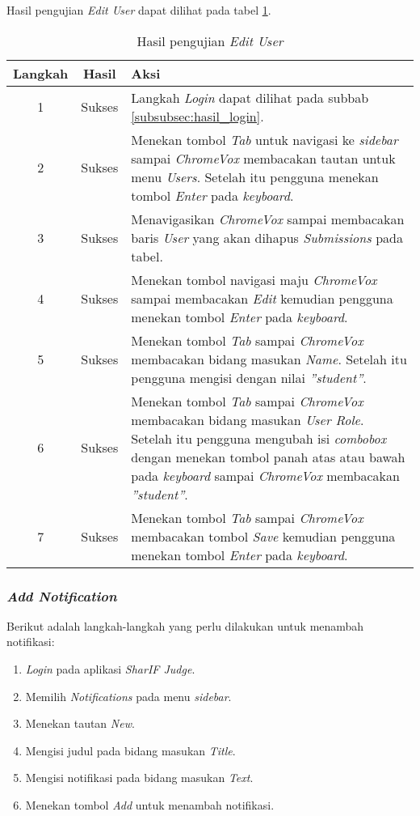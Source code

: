 Hasil pengujian \textit{Edit User} dapat dilihat pada tabel \ref{tab:hasil_edit_user}.

\begin{table}[H]
	\centering
	\caption{Hasil pengujian \textit{Edit User}}
	\label{tab:hasil_edit_user}
	\begin{tabular}{|c|c|p{12cm}|}
		\toprule
		Langkah & Hasil & Aksi\\
		\midrule
		1 & Sukses & Langkah \textit{Login} dapat dilihat pada subbab \ref{subsubsec:hasil_login}.\\
		2 & Sukses & Menekan tombol \textit{Tab} untuk navigasi ke \textit{sidebar} sampai \textit{ChromeVox} membacakan tautan untuk menu \textit{Users}. Setelah itu pengguna menekan tombol \textit{Enter} pada \textit{keyboard}.\\
		3 & Sukses & Menavigasikan \textit{ChromeVox} sampai membacakan baris \textit{User} yang akan dihapus \textit{Submissions} pada tabel.\\
		4 & Sukses & Menekan tombol navigasi maju \textit{ChromeVox} sampai membacakan \textit{Edit} kemudian pengguna menekan tombol \textit{Enter} pada \textit{keyboard}.\\
		5 & Sukses & Menekan tombol \textit{Tab} sampai \textit{ChromeVox} membacakan bidang masukan \textit{Name}. Setelah itu pengguna mengisi dengan nilai \textit{''student''}.\\
		6 & Sukses & Menekan tombol \textit{Tab} sampai \textit{ChromeVox} membacakan bidang masukan \textit{User Role}. Setelah itu pengguna mengubah isi \textit{combobox} dengan menekan tombol panah atas atau bawah pada \textit{keyboard} sampai \textit{ChromeVox} membacakan \textit{''student''}.\\
		7 & Sukses & Menekan tombol \textit{Tab} sampai \textit{ChromeVox} membacakan tombol \textit{Save} kemudian pengguna menekan tombol \textit{Enter} pada \textit{keyboard}.\\
		\bottomrule
	\end{tabular}
\end{table}

\subsubsection{\textit{Add Notification}}
\label{subsubsec:skenario_add_notification}
Berikut adalah langkah-langkah yang perlu dilakukan untuk menambah notifikasi:

\begin{enumerate}
	\item \textit{Login} pada aplikasi \textit{SharIF Judge}.
	\item Memilih \textit{Notifications} pada menu \textit{sidebar}.
	\item Menekan tautan \textit{New}.
	\item Mengisi judul pada bidang masukan \textit{Title}.
	\item Mengisi notifikasi pada bidang masukan \textit{Text}.
	\item Menekan tombol \textit{Add} untuk menambah notifikasi.
\end{enumerate}

